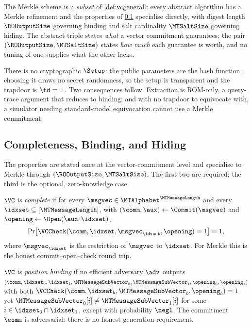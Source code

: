The Merkle scheme is a \emph{subset} of \cref{def:vcgeneral}: every abstract
algorithm has a Merkle refinement and the properties of \cref{sec:props}
specialise directly, with digest length $\ROOutputSize$ governing binding and
salt cardinality $\MTSaltSize$ governing hiding.  The abstract triple states
\emph{what} a vector commitment guarantees; the pair
$(\ROOutputSize,\MTSaltSize)$ states \emph{how much} each guarantee is worth,
and no tuning of one supplies what the other lacks.

There is no cryptographic $\Setup$: the public parameters are the hash
function, choosing it draws no secret randomness, so the setup is transparent
and the trapdoor is $\td=\bot$.  Two consequences follow.  Extraction is
ROM-only, a query-trace argument that reduces to binding; and with no trapdoor
to equivocate with, a simulator needing standard-model equivocation cannot use
a Merkle commitment.

\subsection{Completeness, Binding, and Hiding}
\label{sec:props}

The properties are stated once at the vector-commitment level and specialise
to Merkle through $(\ROOutputSize,\MTSaltSize)$.  The first two are required;
the third is the optional, zero-knowledge case.

\begin{definition}[Completeness]\label{def:vc-complete}
$\VC$ is \emph{complete} if for every $\msgvec\in\MTAlphabet^{\MTMessageLength}$
and every $\idxset\subseteq[\MTMessageLength]$, with
$(\comm,\aux)\leftarrow\Commit(\msgvec)$ and
$\opening\leftarrow\Open(\aux,\idxset)$,
\[
  \Pr\!\left[\VCCheck(\comm,\idxset,\msgvec_{\idxset},\opening)=1\right]=1,
\]
where $\msgvec_{\idxset}$ is the restriction of $\msgvec$ to $\idxset$.  For
Merkle this is the honest commit--open--check round trip.
\end{definition}

\begin{definition}\label{def:vc-binding}
$\VC$ is \emph{position binding} if no efficient adversary $\adv$ outputs
$(\comm,\idxset_0,\idxset_1,\MTMessageSubVector_0,\MTMessageSubVector_1,
\opening_0,\opening_1)$ with both
$\VCCheck(\comm,\idxset_b,\MTMessageSubVector_b,\opening_b)=1$ yet
$\MTMessageSubVector_0[i]\ne\MTMessageSubVector_1[i]$ for some
$i\in\idxset_0\cap\idxset_1$, except with probability $\negl$.  The commitment
$\comm$ is adversarial: there is no honest-generation requirement.
\end{definition}

